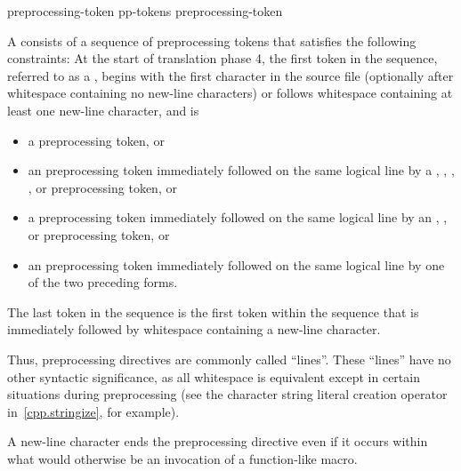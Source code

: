 \documentclass{wg21}
\begin{document}
\begin{bnf}
    \br
    preprocessing-token\br
    pp-tokens preprocessing-token
\end{bnf}

\begin{bnf}
    \br
\end{bnf}

\pnum
A  consists of a sequence of preprocessing tokens
that satisfies the following constraints:
At the start of translation phase 4,
the first token in the sequence,
referred to as a ,
begins with the first character in the source file
(optionally after whitespace containing no new-line characters) or
follows whitespace containing at least one new-line character,
and is

\begin{itemize}
    \item
    a \tcode{\#} preprocessing token, or

    \item
    an  preprocessing token
    immediately followed on the same logical line by a
    ,
    \tcode{<},
    ,
    , or
    \tcode{:}
    preprocessing token, or

    \item
    a  preprocessing token
    immediately followed on the same logical line by an
    ,
    \tcode{:}, or
    \tcode{;}
    preprocessing token, or

    \item
    an  preprocessing token
    immediately followed on the same logical line by
    one of the two preceding forms.
\end{itemize}

The last token in the sequence is the first token within the sequence that
is immediately followed by whitespace containing a new-line character.
\begin{footnote}
    Thus,
    preprocessing directives are commonly called ``lines''.
    These ``lines'' have no other syntactic significance,
    as all whitespace is equivalent except in certain situations
    during preprocessing (see the
    \tcode{\#}
    character string literal creation operator in~\ref{cpp.stringize}, for example).
\end{footnote}
\begin{note}
    A new-line character ends the preprocessing directive even if it occurs
    within what would otherwise be an invocation of a function-like macro.
\end{note}
\end{document}
